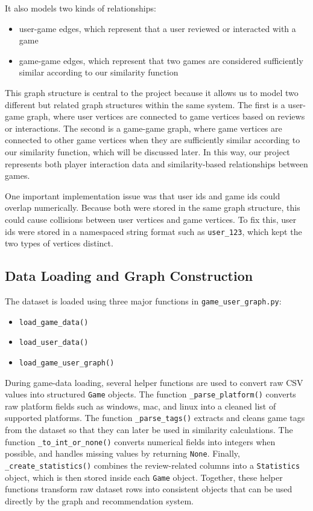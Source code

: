 \documentclass[fontsize=11pt]{article}
\begin{document}
It also models two kinds of relationships:
\begin{itemize}
    \item user-game edges, which represent that a user reviewed or interacted with a game
    \item game-game edges, which represent that two games are considered sufficiently similar according to our similarity function
\end{itemize}

This graph structure is central to the project because it allows us to model two different but related graph structures within the same system. The first is a user-game graph, where user vertices are connected to game vertices based on reviews or interactions. The second is a game-game graph, where game vertices are connected to other game vertices when they are sufficiently similar according to our similarity function, which will be discussed later. In this way, our project represents both player interaction data and similarity-based relationships between games.

One important implementation issue was that user ids and game ids could overlap numerically. Because both were stored in the same graph structure, this could cause collisions between user vertices and game vertices. To fix this, user ids were stored in a namespaced string format such as \texttt{user\_123}, which kept the two types of vertices distinct.

\newpage

\subsection{Data Loading and Graph Construction}

The dataset is loaded using three major functions in \texttt{game\_user\_graph.py}:
\begin{itemize}
    \item \texttt{load\_game\_data()}
    \item \texttt{load\_user\_data()}
    \item \texttt{load\_game\_user\_graph()}
\end{itemize}

During game-data loading, several helper functions are used to convert raw CSV values into structured \texttt{Game} objects. The function \texttt{\_parse\_platform()} converts raw platform fields such as windows, mac, and linux into a cleaned list of supported platforms. The function \texttt{\_parse\_tags()} extracts and cleans game tags from the dataset so that they can later be used in similarity calculations. The function \texttt{\_to\_int\_or\_none()} converts numerical fields into integers when possible, and handles missing values by returning \texttt{None}. Finally, \texttt{\_create\_statistics()} combines the review-related columns into a \texttt{Statistics} object, which is then stored inside each \texttt{Game} object. Together, these helper functions transform raw dataset rows into consistent objects that can be used directly by the graph and recommendation system.
\end{document}
